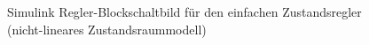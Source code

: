 \begin{figure}[H]
    \centering
    \caption[Einfacher Zustandsregler Simulink (nicht-linear)]{Simulink Regler-Blockschaltbild für den einfachen Zustandsregler (nicht-lineares Zustandsraummodell)}
    \label{fig:Bild20}
\end{figure}


